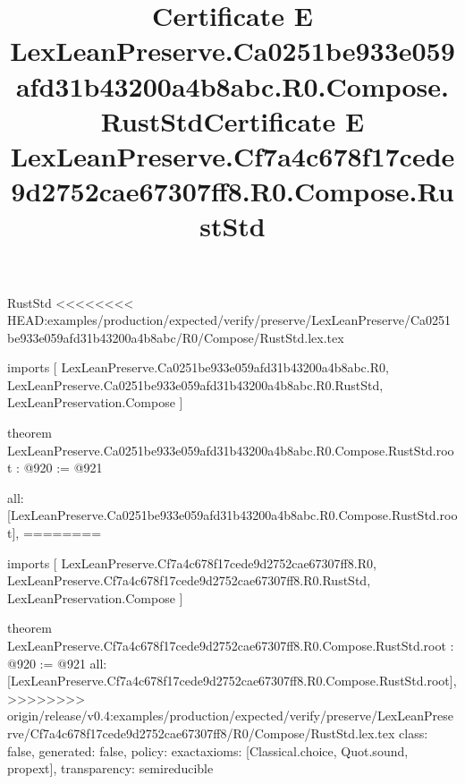 \begin{lexlean}{RustStd}
<<<<<<<< HEAD:examples/production/expected/verify/preserve/LexLeanPreserve/Ca0251be933e059afd31b43200a4b8abc/R0/Compose/RustStd.lex.tex
\title{Certificate E LexLeanPreserve.Ca0251be933e059afd31b43200a4b8abc.R0.Compose.RustStd}
\begin{coremodule}
imports [
  LexLeanPreserve.Ca0251be933e059afd31b43200a4b8abc.R0,
  LexLeanPreserve.Ca0251be933e059afd31b43200a4b8abc.R0.RustStd,
  LexLeanPreservation.Compose
]

theorem LexLeanPreserve.Ca0251be933e059afd31b43200a4b8abc.R0.Compose.RustStd.root : @920 := @921 {
  all: [LexLeanPreserve.Ca0251be933e059afd31b43200a4b8abc.R0.Compose.RustStd.root],
========
\title{Certificate E LexLeanPreserve.Cf7a4c678f17cede9d2752cae67307ff8.R0.Compose.RustStd}
\begin{coremodule}
imports [
  LexLeanPreserve.Cf7a4c678f17cede9d2752cae67307ff8.R0,
  LexLeanPreserve.Cf7a4c678f17cede9d2752cae67307ff8.R0.RustStd,
  LexLeanPreservation.Compose
]

theorem LexLeanPreserve.Cf7a4c678f17cede9d2752cae67307ff8.R0.Compose.RustStd.root : @920 := @921 {
  all: [LexLeanPreserve.Cf7a4c678f17cede9d2752cae67307ff8.R0.Compose.RustStd.root],
>>>>>>>> origin/release/v0.4:examples/production/expected/verify/preserve/LexLeanPreserve/Cf7a4c678f17cede9d2752cae67307ff8/R0/Compose/RustStd.lex.tex
  class: false,
  generated: false,
  policy: exact{axioms: [Classical.choice, Quot.sound, propext]},
  transparency: semireducible
}


\end{coremodule}}
\end{coremodule}
\end{lexlean}
